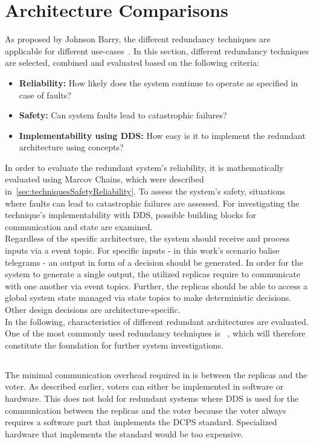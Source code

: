 \section{Architecture Comparisons}
As proposed by Johnson Barry, the different redundancy techniques are applicable for different use-cases~\cite{BarryFaultToleranceAnalysis}.
In this section, different redundancy techniques are selected, combined and evaluated based on the following criteria:

\begin{itemize}
\item \textbf{Reliability:} How likely does the system continue to operate as specified in case of faults?
\item \textbf{Safety:} Can system faults lead to catastrophic failures?
\item \textbf{Implementability using \gls*{DDS}:} How easy is it to implement the redundant architecture using  concepts?
\end{itemize}

In order to evaluate the redundant system's reliability, it is mathematically evaluated using Marcov Chains, which were described in~\autoref{sec:techniquesSafetyReliability}.
To assess the system's safety, situations where faults can lead to catastrophic failures are assessed. 
For investigating the technique's implementability with \gls*{DDS}, possible  building blocks for communication and state are examined.
\\

Regardless of the specific architecture, the system should receive and process inputs via a  event topic.
For specific inputs - in this work's scenario balise telegrams - an output in form of a decision should be generated.
In order for the system to generate a single output, the utilized replicas require to communicate with one another via  event topics.
Further, the replicas should be able to access a global system state managed via  state topics to make deterministic decisions.
Other design decisions are architecture-specific.
\\

In the following, characteristics of different redundant architectures are evaluated.
One of the most commonly used redundancy techniques is ~\cite{FaultToleranceViaNMR}, which will therefore constitute the foundation for further system investigations.

\subsection{}
The minimal communication overhead required in  is between the replicas and the voter.
As described earlier, voters can either be implemented in software or hardware.
This does not hold for redundant systems where \gls*{DDS} is used for the communication between the replicas and the voter because the voter always requires a software part that implements the \gls*{DCPS} standard.
Specialized hardware that implements the  standard would be too expensive.
\\


